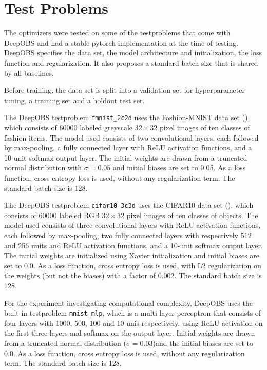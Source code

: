 \documentclass[twoside,12pt,a4paper]{report}
\begin{document}
\section{Test Problems}
The optimizers were tested on some of the testproblems that come with DeepOBS and had a stable pytorch implementation at the time of testing. DeepOBS specifies the data set, the model architecture and initialization, the loss function and regularization. It also proposes a standard batch size that is shared by all baselines.

Before training, the data set is split into a validation set for hyperparameter tuning, a training set and a holdout test set.

The DeepOBS testproblem \verb|fmnist_2c2d| uses the Fashion-MNIST data set (\cite{xiao2017fashion}), which consists of 60000 labeled greyscale $32 \times 32$ pixel images of ten classes of fashion items. The model used consists of two convolutional layers, each followed by max-pooling, a fully connected layer with ReLU activation functions, and a 10-unit softmax output layer. The initial weights are drawn from a truncated normal distribution with $\sigma = 0.05$ and initial biases are set to 0.05. As a loss function, cross entropy loss is used, without any regularization term. The standard batch size is 128.

The DeepOBS testproblem \verb|cifar10_3c3d| uses the CIFAR10 data set (\cite{krizhevsky2014cifar}), which consists of 60000 labeled RGB $32 \times 32$ pixel images of ten classes of objects. The model used consists of three convolutional layers with ReLU activation functions, each followed by max-pooling, two fully connected layers with respectively 512 and 256 units and ReLU activation functions, and a 10-unit softmax output layer. The initial weights are initialized using Xavier initialization and initial biases are set to 0.0. As a loss function, cross entropy loss is used, with L2 regularization on the weights (but not the biases) with a factor of 0.002. The standard batch size is 128.

For the experiment investigating computational complexity, DeepOBS uses the built-in testproblem \verb|mnist_mlp|, which is a multi-layer perceptron that consists of four layers with 1000, 500, 100 and 10 unis respectively, using ReLU activation on the first three layers and softmax on the output layer. Initial weights are drawn from a truncated normal distribution ($\sigma = 0.03$)and the initial biases are set to 0.0. As a loss function, cross entropy loss is used, without any regularization term. The standard batch size is 128.
\end{document}
